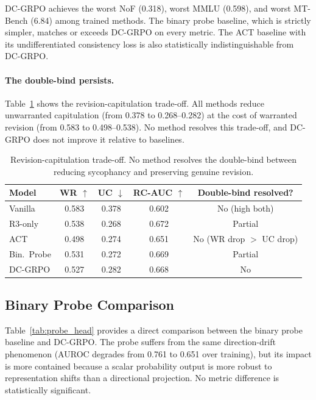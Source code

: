\documentclass[11pt,a4paper]{article}
\begin{document}
DC-GRPO achieves the worst NoF (0.318), worst MMLU (0.598), and worst MT-Bench (6.84) among trained methods. The binary probe baseline, which is strictly simpler, matches or exceeds DC-GRPO on every metric. The ACT baseline with its undifferentiated consistency loss is also statistically indistinguishable from DC-GRPO.

\paragraph{The double-bind persists.} Table~\ref{tab:doublebind} shows the revision-capitulation trade-off. All methods reduce unwarranted capitulation (from 0.378 to 0.268--0.282) at the cost of warranted revision (from 0.583 to 0.498--0.538). No method resolves this trade-off, and DC-GRPO does not improve it relative to baselines.

\begin{table}[h]
\centering
\caption{Revision-capitulation trade-off. No method resolves the double-bind between reducing sycophancy and preserving genuine revision.}
\label{tab:doublebind}
\small
\begin{tabular}{lcccc}
\toprule
Model & WR $\uparrow$ & UC $\downarrow$ & RC-AUC $\uparrow$ & Double-bind resolved? \\
\midrule
Vanilla      & 0.583 & 0.378 & 0.602 & No (high both) \\
R3-only      & 0.538 & 0.268 & 0.672 & Partial \\
ACT          & 0.498 & 0.274 & 0.651 & No (WR drop $>$ UC drop) \\
Bin.\ Probe   & 0.531 & 0.272 & 0.669 & Partial \\
DC-GRPO      & 0.527 & 0.282 & 0.668 & No \\
\bottomrule
\end{tabular}
\end{table}

\subsection{Binary Probe Comparison}
\label{sec:binaryprobe}

Table~\ref{tab:probe_head} provides a direct comparison between the binary probe baseline and DC-GRPO. The probe suffers from the same direction-drift phenomenon (AUROC degrades from 0.761 to 0.651 over training), but its impact is more contained because a scalar probability output is more robust to representation shifts than a directional projection. No metric difference is statistically significant.
\end{document}
